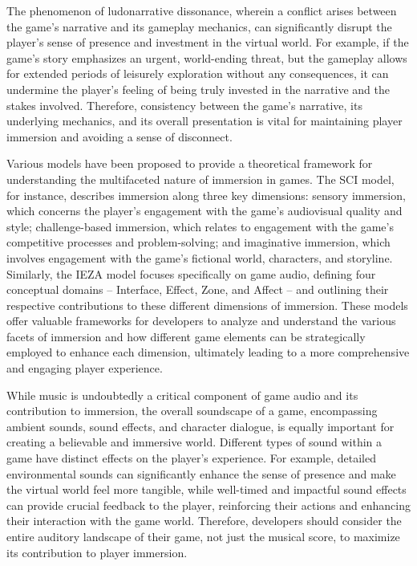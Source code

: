 \documentclass{article}
\begin{document}
    The phenomenon of ludonarrative dissonance, wherein a conflict arises between the game's narrative and its gameplay mechanics, can significantly disrupt the player's sense of presence and investment in the virtual world. For example, if the game's story emphasizes an urgent, world-ending threat, but the gameplay allows for extended periods of leisurely exploration without any consequences, it can undermine the player's feeling of being truly invested in the narrative and the stakes involved. Therefore, consistency between the game's narrative, its underlying mechanics, and its overall presentation is vital for maintaining player immersion and avoiding a sense of disconnect.

    Various models have been proposed to provide a theoretical framework for understanding the multifaceted nature of immersion in games. The SCI model, for instance, describes immersion along three key dimensions: sensory immersion, which concerns the player's engagement with the game's audiovisual quality and style; challenge-based immersion, which relates to engagement with the game's competitive processes and problem-solving; and imaginative immersion, which involves engagement with the game's fictional world, characters, and storyline. Similarly, the IEZA model focuses specifically on game audio, defining four conceptual domains – Interface, Effect, Zone, and Affect – and outlining their respective contributions to these different dimensions of immersion. These models offer valuable frameworks for developers to analyze and understand the various facets of immersion and how different game elements can be strategically employed to enhance each dimension, ultimately leading to a more comprehensive and engaging player experience.

    While music is undoubtedly a critical component of game audio and its contribution to immersion, the overall soundscape of a game, encompassing ambient sounds, sound effects, and character dialogue, is equally important for creating a believable and immersive world. Different types of sound within a game have distinct effects on the player's experience. For example, detailed environmental sounds can significantly enhance the sense of presence and make the virtual world feel more tangible, while well-timed and impactful sound effects can provide crucial feedback to the player, reinforcing their actions and enhancing their interaction with the game world. Therefore, developers should consider the entire auditory landscape of their game, not just the musical score, to maximize its contribution to player immersion.
\end{document}
